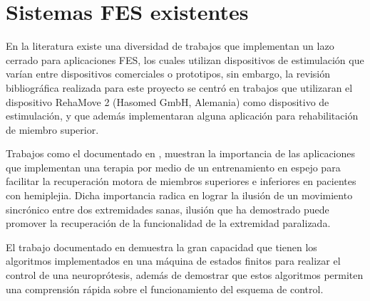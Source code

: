 %

\section{Sistemas FES existentes}
En la literatura existe una diversidad de trabajos que implementan un lazo cerrado para aplicaciones FES, los cuales utilizan dispositivos de estimulación que varían entre dispositivos comerciales o prototipos, sin embargo, la revisión bibliográfica realizada para este proyecto se centró en trabajos que utilizaran el dispositivo RehaMove 2 (Hasomed GmbH, Alemania) como dispositivo de estimulación, y que además implementaran alguna aplicación para rehabilitación de miembro superior.

Trabajos como el documentado en \cite{Salchow2016}, muestran la importancia de las aplicaciones que implementan una terapia por medio de un entrenamiento en espejo para facilitar la recuperación motora de miembros superiores e inferiores en pacientes con hemiplejia. Dicha importancia radica en lograr la ilusión de un movimiento sincrónico entre dos extremidades sanas, ilusión que ha demostrado puede promover la recuperación de la funcionalidad de la extremidad paralizada.

El trabajo documentado en \cite{Sun2014} demuestra la gran capacidad que tienen los algoritmos implementados en una máquina de estados finitos para realizar el control de una neuroprótesis, además de demostrar que estos algoritmos permiten una comprensión rápida sobre el funcionamiento del esquema de control.

